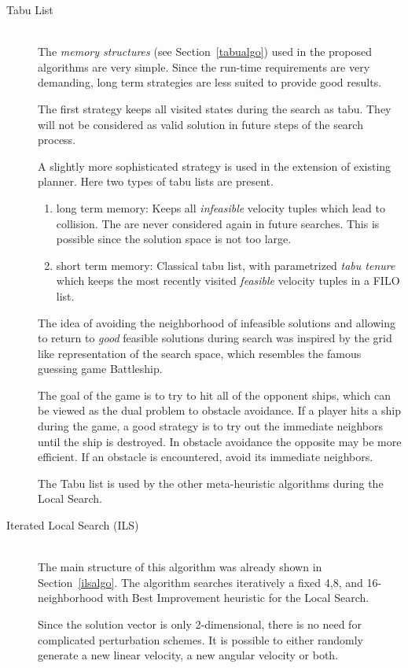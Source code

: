 \begin{description}
\item[Tabu List]\hfill \\
The \emph{memory structures} (see Section~\ref{tabualgo}) used in the proposed algorithms are very simple. 
Since the run-time requirements are very demanding, long term strategies are less suited to provide good results.

The first strategy keeps all visited states during the search as tabu. They will not be considered as valid solution in future steps of the search process. 

A slightly more sophisticated strategy is used in the extension of existing planner.
Here two types of tabu lists are present.
\begin{enumerate}
\item{long term memory:} Keeps all \emph{infeasible} velocity tuples which lead to collision. The are never considered again in future searches. This is possible since the solution space is not too large.
\item{short term memory:} Classical tabu list, with parametrized \emph{tabu tenure} which keeps the most recently visited \emph{feasible} velocity tuples in a FILO list.
\end{enumerate}

The idea of avoiding the neighborhood of infeasible solutions and allowing to return to \emph{good} feasible solutions during search was inspired by the grid like representation of the search space, which resembles the famous guessing game Battleship. 

The goal of the game is to try to hit all of the opponent ships, which can be viewed as the dual problem to obstacle avoidance. 
If a player hits a ship during the game, a good strategy is to try out the immediate neighbors until the ship is destroyed. 
In obstacle avoidance the opposite may be more efficient. If an obstacle is encountered, avoid its immediate neighbors.

The Tabu list is used by the other meta-heuristic algorithms during the Local Search.
\item[Iterated Local Search (ILS)]\hfill \\
The main structure of this algorithm was already shown in Section~\ref{ilsalgo}.
The algorithm searches iteratively a fixed 4,8, and 16-neighborhood with Best Improvement heuristic for the Local Search.

Since the solution vector is only 2-dimensional, there is no need for complicated perturbation schemes. 
It is possible to either randomly generate a new linear velocity, a new angular velocity or both. 


\end{description}
